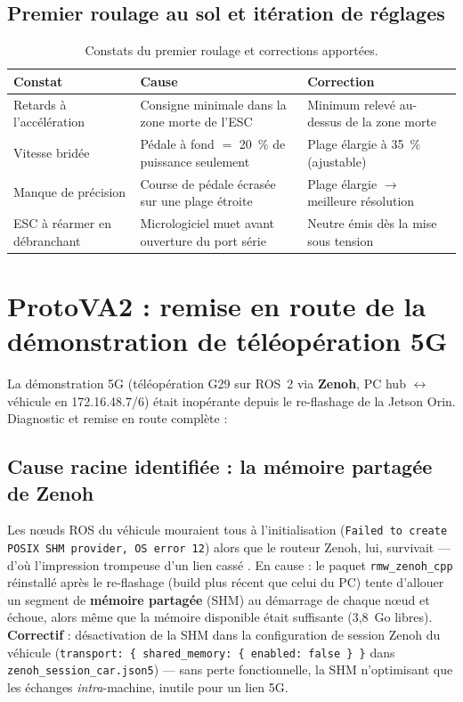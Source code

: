 \documentclass[11pt,a4paper]{article}
\begin{document}
\subsection{Premier roulage au sol et itération de réglages}

\begin{table}[ht]
  \centering
  \begin{tabular}{p{4.2cm}p{4.6cm}p{4.6cm}}
    \toprule
    \textbf{Constat} & \textbf{Cause} & \textbf{Correction} \\
    \midrule
    Retards à l'accélération & Consigne minimale dans la zone morte de l'ESC &
      Minimum relevé au-dessus de la zone morte \\
    Vitesse bridée & Pédale à fond $=$ 20~\% de puissance seulement &
      Plage élargie à 35~\% (ajustable) \\
    Manque de précision & Course de pédale écrasée sur une plage étroite &
      Plage élargie $\rightarrow$ meilleure résolution \\
    ESC à réarmer en débranchant & Micrologiciel muet avant ouverture du port série &
      Neutre émis dès la mise sous tension \\
    \bottomrule
  \end{tabular}
  \caption{Constats du premier roulage et corrections apportées.}
\end{table}

\section{ProtoVA2 : remise en route de la démonstration de téléopération 5G}

La démonstration 5G (téléopération G29 sur ROS~2 via \textbf{Zenoh}, PC hub
$\leftrightarrow$ véhicule en 172.16.48.7/6) était inopérante depuis le
re-flashage de la Jetson Orin. Diagnostic et remise en route complète :

\subsection{Cause racine identifiée : la mémoire partagée de Zenoh}
Les n\oe uds ROS du véhicule mouraient tous à l'initialisation
(\texttt{Failed to create POSIX SHM provider, OS error 12}) alors que le routeur
Zenoh, lui, survivait --- d'où l'impression trompeuse d'un lien \og cassé \fg{}.
En cause : le paquet \texttt{rmw\_zenoh\_cpp} réinstallé après le re-flashage
(build plus récent que celui du PC) tente d'allouer un segment de
\textbf{mémoire partagée} (SHM) au démarrage de chaque n\oe ud et échoue,
alors même que la mémoire disponible était suffisante (3,8~Go libres).
\textbf{Correctif} : désactivation de la SHM dans la configuration de session
Zenoh du véhicule (\texttt{transport: \{ shared\_memory: \{ enabled: false \} \}}
dans \texttt{zenoh\_session\_car.json5}) --- sans perte fonctionnelle, la SHM
n'optimisant que les échanges \emph{intra}-machine, inutile pour un lien 5G.
\end{document}
